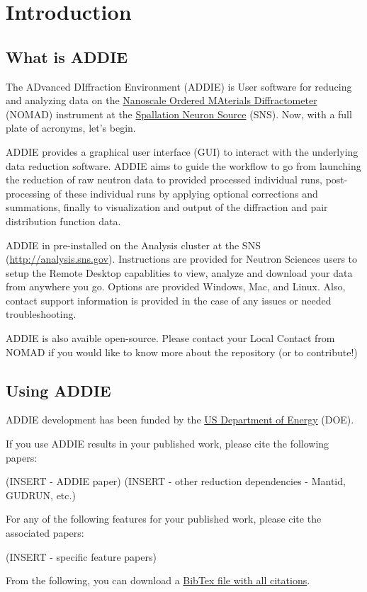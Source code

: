 \chapter{Introduction}
\section{What is ADDIE}
The ADvanced DIffraction Environment (ADDIE) is User software for 
reducing and analyzing data on the  
\href{http://https://neutrons.ornl.gov/nomad}{Nanoscale Ordered MAterials Diffractometer}  (NOMAD)  instrument at the \href{https://neutrons.ornl.gov/sns}{Spallation Neuron Source} (SNS). 
Now, with a full plate of acronyms, let's begin.


ADDIE provides a graphical user interface (GUI) to interact with the 
underlying data reduction software. ADDIE aims to guide the workflow to 
go from launching the reduction of raw neutron data to provided processed 
individual runs, post-processing of these individual runs  by applying 
optional corrections and summations, finally to visualization and 
output of the diffraction and pair distribution function data. 

ADDIE in pre-installed on the Analysis cluster at the SNS 
(\url{http://analysis.sns.gov}). Instructions are provided for Neutron Sciences users 
to setup the Remote Desktop capablities to view, analyze and download your data 
from anywhere you go. Options are provided Windows, Mac, and Linux. 
Also, contact support information is provided in the case of 
any issues or needed troubleshooting.

ADDIE is also avaible open-source. 
Please contact your Local Contact from NOMAD if you would like to 
know more about the repository (or to contribute!)
\section{Using ADDIE}

ADDIE development has been funded by the 
\href{https://www.energy.gov/}{US Department of Energy} (DOE). 

If you use ADDIE results in your published work, please cite the following papers:

(INSERT - ADDIE paper)
(INSERT - other reduction dependencies - Mantid, GUDRUN, etc.)

For any of the following features for your published work, please cite the associated papers:

(INSERT - specific feature papers)

From the following, you can download a \href{http://https://neutrons.ornl.gov/nomad}{BibTex file with all citations}.



